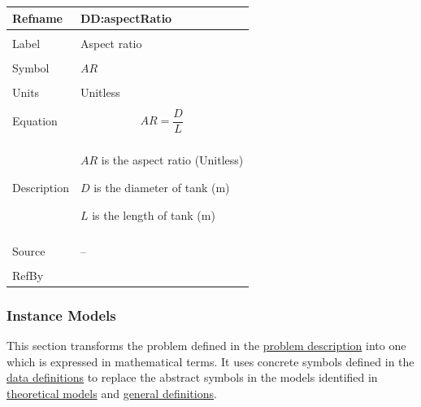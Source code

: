 \documentclass[12pt]{article}
\begin{document}
\vspace{\baselineskip}
\noindent
\begin{minipage}{\textwidth}
\begin{tabular}{>{\raggedright}p{}>{\raggedright\arraybackslash}p{}}
\toprule \textbf{Refname} & \textbf{DD:aspectRatio}
\label{DD:aspectRatio}
\\ \midrule \\
Label & Aspect ratio
        
\\ \midrule \\
Symbol & $AR$
         
\\ \midrule \\
Units & Unitless
        
\\ \midrule \\
Equation & \begin{displaymath}
           AR=\frac{D}{L}
           \end{displaymath}
\\ \midrule \\
Description & \begin{symbDescription}
              \item{$AR$ is the aspect ratio (Unitless)}
              \item{$D$ is the diameter of tank (${\text{m}}$)}
              \item{$L$ is the length of tank (${\text{m}}$)}
              \end{symbDescription}
\\ \midrule \\
Source & --
         
\\ \midrule \\
RefBy & 
\\ \bottomrule
\end{tabular}
\end{minipage}

\subsubsection{Instance Models}
\label{Sec:IMs}
This section transforms the problem defined in the \hyperref[Sec:ProbDesc]{problem description} into one which is expressed in mathematical terms. It uses concrete symbols defined in the \hyperref[Sec:DDs]{data definitions} to replace the abstract symbols in the models identified in \hyperref[Sec:TMs]{theoretical models} and \hyperref[Sec:GDs]{general definitions}.
\end{document}
